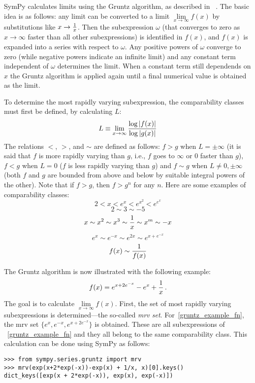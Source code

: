 SymPy calculates limits using the Gruntz algorithm, as described in%
~\cite{Gruntz1996limits}. The basic idea is as follows: any limit can be
converted to a limit $\lim\limits_{x\to\infty} f(x)$ by substitutions like
$x\to{1\over x}$. Then the subexpression $\omega$ (that converges
to zero as $x\to\infty$ faster than all other subexpressions) is identified in
$f(x)$, and $f(x)$ is expanded into a series with respect to $\omega$. Any
positive powers of $\omega$ converge to zero (while negative powers indicate
an infinite limit) and any constant term independent of
$\omega$ determines the limit. When a constant term still dependends on
$x$ the Gruntz algorithm is applied again until a final numerical value
is obtained as the limit.

To determine the most rapidly varying subexpression, the comparability classes
must first be defined, by calculating $L$:
\begin{equation}
L\equiv \lim_{x\to\infty} {\log |f(x)| \over \log |g(x)|}
\end{equation}
The relations $<$, $>$, and $\sim$ are defined as follows: $f>g$ when
$L=\pm\infty$ (it is said that $f$ is more rapidly varying than $g$, i.e., $f$
goes to $\infty$ or $0$ faster than $g$), $f<g$ when $L=0$ ($f$ is less
rapidly varying than $g$) and $f\sim g$ when $L\neq 0,\pm\infty$ (both $f$ and
$g$ are bounded from above and below by suitable integral powers of the
other). Note that if $f > g$, then $f > g^n$ for any $n$. Here
are some examples of comparability classes:
\[2 < x < e^x < e^{x^2} < e^{e^x}\]
\[2\sim 3\sim -5\]
\[x\sim x^2\sim x^3\sim {1\over x}\sim x^m\sim -x\]
\[e^x\sim e^{-x}\sim e^{2x}\sim e^{x+e^{-x}}\]
\[f(x)\sim{1\over f(x)}\]

The Gruntz algorithm is now illustrated with the following example:
\begin{equation}
    \label{gruntz_example_fn}
f(x) = e^{x+2e^{-x}} - e^x + {1\over x} \,.
\end{equation}
The goal is to calculate $\lim\limits_{x\to\infty} f(x)$. First, the set of
most rapidly varying subexpressions is determined---the so-called \textit{mrv
  set}. For~\eqref{gruntz_example_fn}, the mrv set
$\{e^x, e^{-x}, e^{x+2e^{-x}}\}$ is obtained. These are all subexpressions of%
~\eqref{gruntz_example_fn} and they all belong to the same comparability
class. This calculation can be done using SymPy as follows:

\begin{verbatim}
>>> from sympy.series.gruntz import mrv
>>> mrv(exp(x+2*exp(-x))-exp(x) + 1/x, x)[0].keys()
dict_keys([exp(x + 2*exp(-x)), exp(x), exp(-x)])
\end{verbatim}

